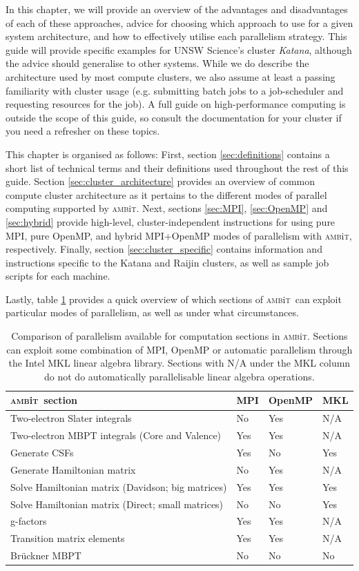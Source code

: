 \documentclass{report}
\newcommand{\ambit}{\textsc{amb}{\footnotesize i}\textsc{t}}
\begin{document}
In this chapter, we will provide an overview of the advantages and disadvantages of each of these
approaches, advice for choosing which approach to use for a given system architecture, and how to
effectively utilise each parallelism strategy. This guide will provide specific examples for UNSW 
Science's cluster \textit{Katana}, although the advice should generalise to other systems. While we do
describe the architecture used by most compute clusters, we also assume at least a passing familiarity
with cluster usage (e.g. submitting batch jobs to a job-scheduler and requesting resources for the job).
A full guide on high-performance computing is outside the scope of this guide, so consult the
documentation for your cluster if you need a refresher on these topics.

This chapter is organised as follows:
First, section \ref{sec:definitions} contains a short list of technical terms and their definitions used
throughout the rest of this guide. Section \ref{sec:cluster_architecture} provides an overview of common
compute cluster architecture as it pertains to the different modes of parallel computing supported by
\ambit. Next, sections \ref{sec:MPI}, \ref{sec:OpenMP} and \ref{sec:hybrid} provide high-level,
cluster-independent instructions for using pure MPI, pure OpenMP, and hybrid MPI+OpenMP modes of 
parallelism with \ambit, respectively. Finally, section \ref{sec:cluster_specific} contains information
and instructions specific to the Katana and Raijin clusters, as well as sample job scripts for each
machine.

Lastly, table \ref{tab:parallelism} provides a quick overview of which sections of \ambit\ can exploit
particular modes of parallelism, as well as under what circumstances.


\begin{table}
\label{tab:parallelism}
\caption{Comparison of parallelism available for computation sections in \ambit. Sections can exploit
some combination of MPI, OpenMP or automatic parallelism through the Intel MKL linear algebra library.
Sections with N/A under the MKL column do not do automatically parallelisable linear algebra operations.}
\begin{tabular}{l l l l}
\hline
\ambit\ section & MPI   &OpenMP  &MKL\\
\hline
\hline
Two-electron Slater integrals   &No &Yes &N/A\\
Two-electron MBPT integrals (Core and Valence) &Yes    &Yes    &N/A\\
Generate CSFs   &Yes    &No &Yes\\
Generate Hamiltonian matrix     &No &Yes    &N/A\\
Solve Hamiltonian matrix (Davidson; big matrices) &Yes    &Yes    &Yes\\
Solve Hamiltonian matrix (Direct; small matrices)   &No &No &Yes\\
g-factors   &Yes    &Yes    &N/A\\
Transition matrix elements  &Yes    &Yes    &N/A\\
Br\"{u}ckner MBPT   &No &No &No\\
\hline
\end{tabular}
\end{table}
\end{document}
